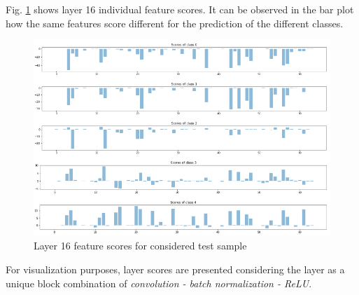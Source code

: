 \documentclass[preprint]{elsarticle}
\theoremstyle{definition} %
\theoremstyle{remark}
\begin{document}
Fig. \ref{fig:feature_scores} shows layer 16 individual feature scores. It can be observed in the bar plot how the same features score different for the prediction of the different classes.

\begin{figure}[h!]
	\centering
	\includegraphics[width=\textwidth]{figures/score_prop_23713_left/feature_scores.png}
	\caption{Layer 16 feature scores for considered test sample}
	\label{fig:feature_scores}
\end{figure}

For visualization purposes, layer scores are presented considering the layer as a unique block combination of \emph{convolution - batch normalization - ReLU}. 
\end{document}
